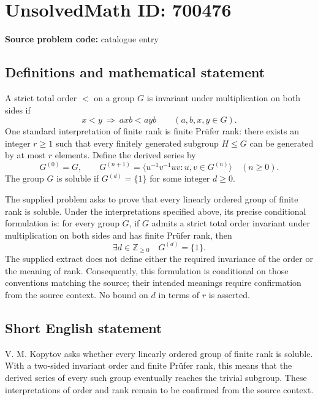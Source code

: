 \documentclass[11pt]{article}
\newcommand{\Z}{\mathbb{Z}}
\begin{document}
\section*{UnsolvedMath ID: 700476}
\textbf{Source problem code:} catalogue entry
\subsection{Definitions and mathematical statement}
A strict total order \(<\) on a group \(G\) is invariant under multiplication on both sides if
\[
x<y\ \Longrightarrow\ axb<ayb
\qquad(a,b,x,y\in G).
\]
One standard interpretation of finite rank is finite Pr\"ufer rank: there exists an integer \(r\geq 1\) such that every finitely generated subgroup \(H\leq G\) can be generated by at most \(r\) elements. Define the derived series by
\[
G^{(0)}=G,\qquad
G^{(n+1)}=\bigl\langle u^{-1}v^{-1}uv : u,v\in G^{(n)}\bigr\rangle
\quad(n\geq 0).
\]
The group \(G\) is soluble if \(G^{(d)}=\{1\}\) for some integer \(d\geq 0\).

The supplied problem asks to prove that every linearly ordered group of finite rank is soluble. Under the interpretations specified above, its precise conditional formulation is: for every group \(G\), if \(G\) admits a strict total order invariant under multiplication on both sides and has finite Pr\"ufer rank, then
\[
\exists d\in\Z_{\geq 0}\quad G^{(d)}=\{1\}.
\]
The supplied extract does not define either the required invariance of the order or the meaning of rank. Consequently, this formulation is conditional on those conventions matching the source; their intended meanings require confirmation from the source context. No bound on \(d\) in terms of \(r\) is asserted.
\subsection{Short English statement}
V. M. Kopytov asks whether every linearly ordered group of finite rank is soluble. With a two-sided invariant order and finite Pr\"ufer rank, this means that the derived series of every such group eventually reaches the trivial subgroup. These interpretations of order and rank remain to be confirmed from the source context.
\end{document}
